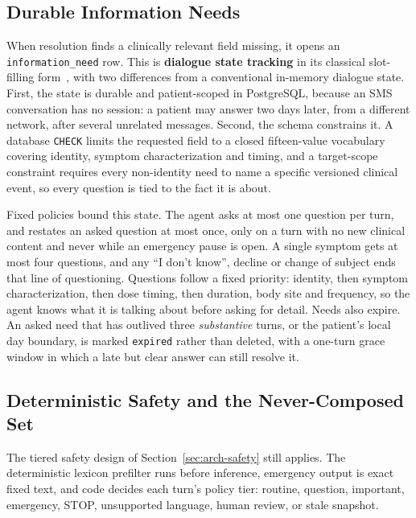 \subsection{Durable Information Needs}
\label{sec:conv-needs}

When resolution finds a clinically relevant field missing, it opens an
\texttt{information\_need} row. This is \textbf{dialogue state tracking} in its
classical slot-filling form~\cite{balaraman2021dst}, with two differences from a
conventional in-memory dialogue state. First, the state is durable and
patient-scoped in PostgreSQL, because an SMS conversation has no session: a
patient may answer two days later, from a different network, after several
unrelated messages. Second, the schema constrains it. A database \texttt{CHECK}
limits the requested field to a closed fifteen-value vocabulary covering
identity, symptom characterization and timing, and a target-scope constraint
requires every non-identity need to name a specific versioned clinical event, so
every question is tied to the fact it is about.

Fixed policies bound this state. The agent asks at most one question per turn,
and restates an asked question at most once, only on a turn with no new clinical
content and never while an emergency pause is open. A single symptom gets at
most four questions, and any ``I don't know'', decline or change of subject ends
that line of questioning. Questions follow a fixed priority: identity, then
symptom characterization, then dose timing, then duration, body site and
frequency, so the agent knows what it is talking about before asking for detail.
Needs also expire. An asked need that has outlived three \emph{substantive}
turns, or the patient's local day boundary, is marked \texttt{expired} rather
than deleted, with a one-turn grace window in which a late but clear answer can
still resolve it.

\subsection{Deterministic Safety and the Never-Composed Set}
\label{sec:conv-safety}

The tiered safety design of Section~\ref{sec:arch-safety} still applies. The
deterministic lexicon prefilter runs before inference, emergency output is exact
fixed text, and code decides each turn's policy tier: routine, question,
important, emergency, STOP, unsupported language, human review, or stale
snapshot.

